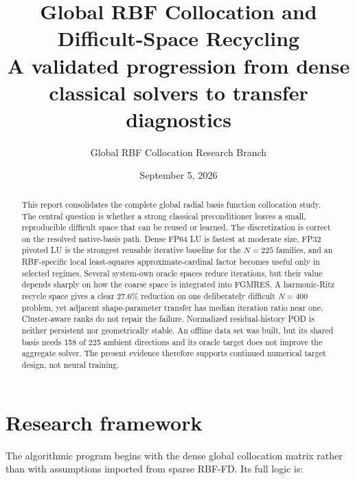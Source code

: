 \documentclass[11pt]{article}
\title{\textbf{Global RBF Collocation and Difficult-Space Recycling}\\
\large A validated progression from dense classical solvers to transfer diagnostics}
\author{Global RBF Collocation Research Branch}
\date{September 5, 2026}
\begin{document}
\maketitle

\begin{abstract}
This report consolidates the complete global radial basis function collocation study. The central question is whether a strong classical preconditioner leaves a small, reproducible difficult space that can be reused or learned. The discretization is correct on the resolved native-basis path. Dense FP64 LU is fastest at moderate size, FP32 pivoted LU is the strongest reusable iterative baseline for the $N=225$ families, and an RBF-specific local least-squares approximate-cardinal factor becomes useful only in selected regimes. Several system-own oracle spaces reduce iterations, but their value depends sharply on how the coarse space is integrated into FGMRES. A harmonic-Ritz recycle space gives a clear 27.6\% reduction on one deliberately difficult $N=400$ problem, yet adjacent shape-parameter transfer has median iteration ratio near one. Cluster-aware ranks do not repair the failure. Normalized residual-history POD is neither persistent nor geometrically stable. An offline data set was built, but its shared basis needs 158 of 225 ambient directions and its oracle target does not improve the aggregate solver. The present evidence therefore supports continued numerical target design, not neural training.
\end{abstract}

\section{Research framework}

The algorithmic program begins with the dense global collocation matrix rather than with assumptions imported from sparse RBF-FD. Its full logic is:
\end{document}
